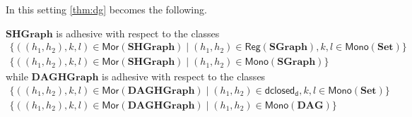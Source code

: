 \documentclass[runningheads,envcountsect]{lmcs}
\newcommand{\dgr}{\catname{SGraph}}
\newcommand{\dg}{\catname{DAG}}
\newcommand{\rtd}{\mathsf{dclosed_{d}}}
\newcommand{\catname}[1]{\mathbf{#1}}
\newcommand{\arr}[1]{\mathsf{Mor}(\catname{#1})}
\newcommand{\mono}[1]{\mathsf{Mono}(\catname{#1})}
\newcommand{\reg}[1]{\mathsf{Reg}(\catname{#1})}
\theoremstyle{plain}
\theoremstyle{definition}
\begin{document}
In this setting \cref{thm:dg} becomes the following.
\begin{thm}
	$\catname{SHGraph}$ is adhesive with respect to the classes
	\begin{gather*}
	\{((h_1,h_2), k, l)\in \arr{SHGraph}\mid (h_1,h_2)\in \reg{\dgr}, k, l \in \mono{Set}\}\\
	\{((h_1,h_2), k, l)\in \arr{SHGraph}\mid (h_1,h_2)\in \mono{\dgr}\}
	\end{gather*}
	while $\catname{DAGHGraph}$ is adhesive with respect to the classes	\begin{gather*}
	\{((h_1,h_2), k, l)\in \arr{DAGHGraph}\mid (h_1,h_2)\in \rtd, k, l \in \mono{Set}\}\\
	\{((h_1,h_2), k, l)\in \arr{DAGHGraph}\mid (h_1,h_2)\in \mono{\dg}\}
	\end{gather*}
\end{thm}
\end{document}
